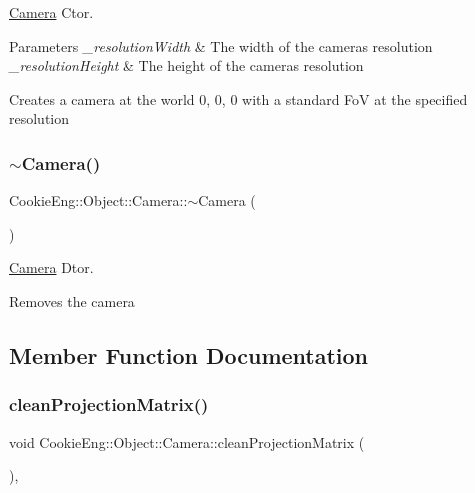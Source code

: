 \hyperlink{class_cookie_eng_1_1_object_1_1_camera}{Camera} Ctor. 


\begin{DoxyParams}{Parameters}
{\em \+\_\+resolution\+Width} & The width of the camera\textquotesingle{}s resolution \\
\hline
{\em \+\_\+resolution\+Height} & The height of the camera\textquotesingle{}s resolution\\
\hline
\end{DoxyParams}
Creates a camera at the world 0, 0, 0 with a standard FoV at the specified resolution \mbox{\label{class_cookie_eng_1_1_object_1_1_camera_a8d672ca800d63af6fe3d6665471a2b05}} 
\subsubsection{\texorpdfstring{$\sim$\+Camera()}{~Camera()}}
{\footnotesize\ttfamily Cookie\+Eng\+::\+Object\+::\+Camera\+::$\sim$\+Camera (\begin{DoxyParamCaption}{ }\end{DoxyParamCaption})\hspace{0.3cm}{\ttfamily [inline]}}



\hyperlink{class_cookie_eng_1_1_object_1_1_camera}{Camera} Dtor. 

Removes the camera 

\subsection{Member Function Documentation}
\mbox{\label{class_cookie_eng_1_1_object_1_1_camera_ab685b627f1a3bc019ae68185d41ee38b}} 
\subsubsection{\texorpdfstring{clean\+Projection\+Matrix()}{cleanProjectionMatrix()}}
{\footnotesize\ttfamily void Cookie\+Eng\+::\+Object\+::\+Camera\+::clean\+Projection\+Matrix (\begin{DoxyParamCaption}{ }\end{DoxyParamCaption})\hspace{0.3cm}{\ttfamily [inline]}, {\ttfamily [protected]}}



